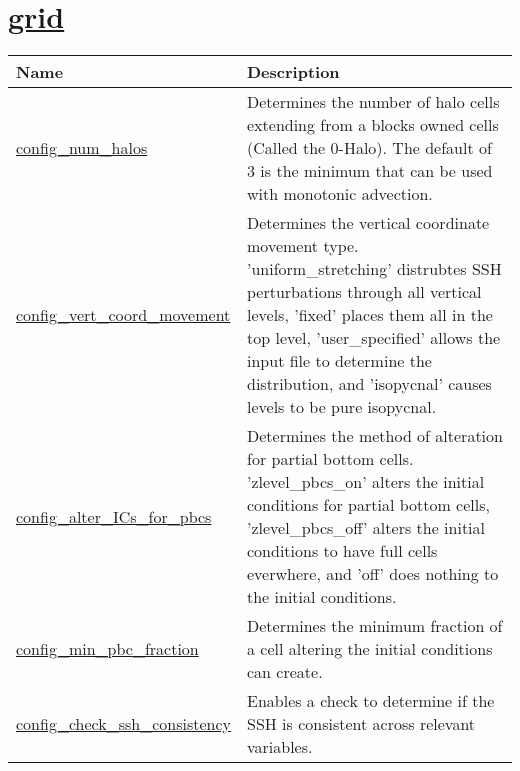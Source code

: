 \section[grid]{\hyperref[sec:nm_sec_grid]{grid}}
\label{sec:nm_tab_grid}

{\small
\begin{center}
\begin{longtable}{| p{2.0in} || p{4.0in} |}
	\hline
	{\bf Name} & {\bf Description} \\
	\hline
	\hline
	\hyperref[subsec:nm_sec_config_num_halos]{config\_num\_halos} & Determines the number of halo cells extending from a blocks owned cells (Called the 0-Halo). The default of 3 is the minimum that can be used with monotonic advection. \\
	\hline
	\hyperref[subsec:nm_sec_config_vert_coord_movement]{config\_vert\_coord\_movement} & Determines the vertical coordinate movement type. 'uniform\_stretching' distrubtes SSH perturbations through all vertical levels, 'fixed' places them all in the top level, 'user\_specified' allows the input file to determine the distribution, and 'isopycnal' causes levels to be pure isopycnal. \\
	\hline
	\hyperref[subsec:nm_sec_config_alter_ICs_for_pbcs]{config\_alter\_ICs\_for\_pbcs} & Determines the method of alteration for partial bottom cells. 'zlevel\_pbcs\_on' alters the initial conditions for partial bottom cells, 'zlevel\_pbcs\_off' alters the initial conditions to have full cells everwhere, and 'off' does nothing to the initial conditions. \\
	\hline
	\hyperref[subsec:nm_sec_config_min_pbc_fraction]{config\_min\_pbc\_fraction} & Determines the minimum fraction of a cell altering the initial conditions can create. \\
	\hline
	\hyperref[subsec:nm_sec_config_check_ssh_consistency]{config\_check\_ssh\_consistency} & Enables a check to determine if the SSH is consistent across relevant variables. \\
	\hline
\end{longtable}
\end{center}
}
